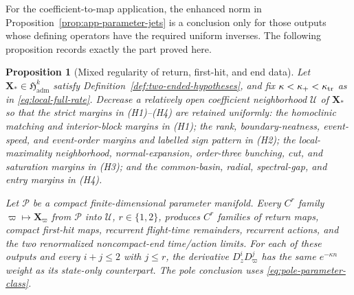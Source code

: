 \documentclass[11pt]{amsart}
\numberwithin{equation}{section}
\newtheorem{proposition}[theorem]{Proposition}
\theoremstyle{definition}
\theoremstyle{remark}
\newcommand{\cU}{\mathcal U}
\begin{document}
For the coefficient-to-map application, the enhanced norm in
Proposition~\ref{prop:app-parameter-jets} is a conclusion only for those
outputs whose defining operators have the required uniform inverses.  The
following proposition records exactly the part proved here.

\begin{proposition}[Mixed regularity of return, first-hit, and end data]
\label{prop:coefficient-to-map-regularity}
Let $\mathbf X_*\in\mathfrak H_{\mathrm{adm}}^k$ satisfy
Definition~\ref{def:two-ended-hypotheses}, and fix
$\kappa<\kappa_+<\kappa_{\rm tr}$ as in
\eqref{eq:local-full-rate}.  Decrease a relatively open coefficient
neighborhood $\cU$ of $\mathbf X_*$ so that the strict margins in
\textup{(H1)}--\textup{(H4)} are retained uniformly: the homoclinic
matching and interior-block margins in \textup{(H1)}; the rank,
boundary-neatness, event-speed, and event-order margins and labelled sign
pattern in \textup{(H2)};
the local-maximality neighborhood, normal-expansion, order-three
bunching, cut, and saturation margins in \textup{(H3)}; and the
common-basin, radial, spectral-gap, and entry
margins in \textup{(H4)}.

Let $\mathcal P$ be a compact finite-dimensional parameter manifold.  Every
$C^r$ family $\varpi\mapsto\mathbf X_\varpi$ from $\mathcal P$ into
$\cU$, $r\in\{1,2\}$, produces $C^r$ families of return maps, compact
first-hit maps, recurrent
flight-time remainders, recurrent actions, and the two renormalized
noncompact-end time/action limits.  For each of these outputs and every
$i+j\le2$ with $j\le r$, the derivative
$D_z^iD_\varpi^j$ has the same
$e^{-\kappa n}$ weight as its state-only counterpart.  The pole conclusion
uses \eqref{eq:pole-parameter-class}.
\end{proposition}
\end{document}
